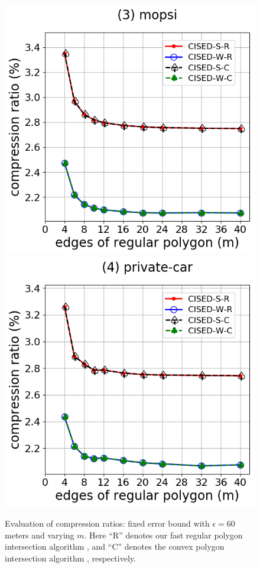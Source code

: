 {\begin{figure}[tb!]
\includegraphics[scale = 0.290]{Figures/Exp-M-e-60-CR-mopsi.png}\hspace{1ex}
\includegraphics[scale = 0.290]{Figures/Exp-M-e-60-CR-private.png}
\caption{\small Evaluation of compression ratios: fixed error bound with $\epsilon=60$ meters and varying $m$.
Here ``R'' denotes our fast regular polygon intersection algorithm \rpia, and ``C'' denotes the convex polygon intersection algorithm \cpia, respectively.}
\label{fig:m-cr-e60}
\end{figure}


}
